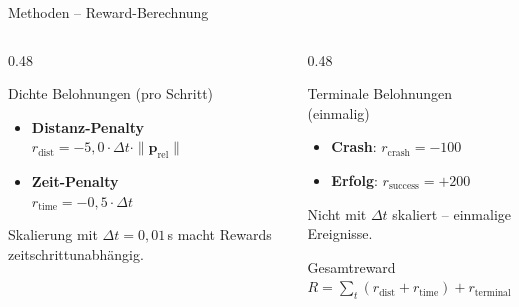 \begin{frame}{Methoden -- Reward-Berechnung}
\begin{columns}[T]
\begin{column}{0.48\textwidth}
  \begin{block}{Dichte Belohnungen (pro Schritt)}
    \begin{itemize}
      \item \textbf{Distanz-Penalty}\\
            $r_\text{dist} = -5{,}0 \cdot \Delta t \cdot \|\mathbf{p}_\text{rel}\|$
      \item \textbf{Zeit-Penalty}\\
            $r_\text{time} = -0{,}5 \cdot \Delta t$
    \end{itemize}
    \vspace{0.2em}
    {\small Skalierung mit $\Delta t = 0{,}01\,$s macht Rewards zeitschrittunabhängig.}
  \end{block}
\end{column}
\begin{column}{0.48\textwidth}
  \begin{exampleblock}{Terminale Belohnungen (einmalig)}
    \begin{itemize}
      \item \textbf{Crash}: $r_\text{crash} = -100$
      \item \textbf{Erfolg}: $r_\text{success} = +200$
    \end{itemize}
    \vspace{0.2em}
    {\small Nicht mit $\Delta t$ skaliert -- einmalige Ereignisse.}
  \end{exampleblock}
  \begin{alertblock}{Gesamtreward}
    $R = \sum_t (r_\text{dist} + r_\text{time}) + r_\text{terminal}$
  \end{alertblock}
\end{column}
\end{columns}
\end{frame}


